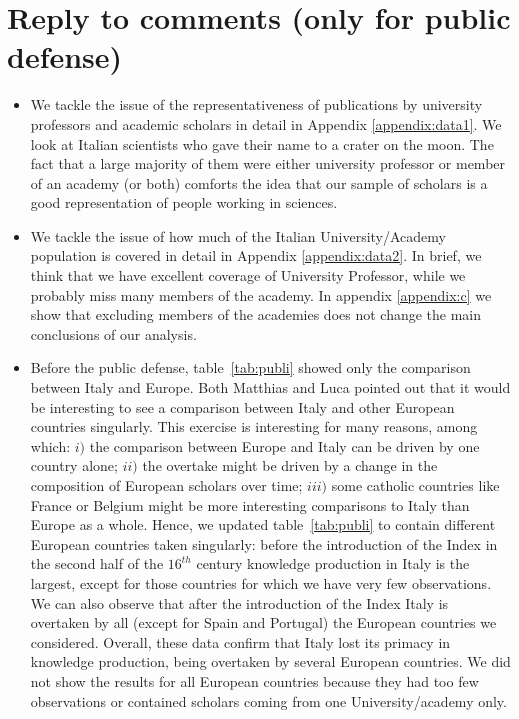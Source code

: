 \section{Reply to comments (only for public defense)}
\begin{itemize}

\item We tackle the issue of the representativeness of publications by university professors and academic scholars in detail in Appendix \ref{appendix:data1}. We look at Italian scientists who gave their name to a crater on the moon. The fact that a large majority of them were either university professor or member of an academy (or both) comforts the idea that our sample of scholars is a good representation of people working in sciences.
\item We tackle the issue of how much of the Italian University/Academy population is covered in detail in Appendix \ref{appendix:data2}. In brief, we think that we have excellent coverage of University Professor, while we probably miss many members of the academy. In appendix \ref{appendix:c} we show that excluding members of the academies does not change the main conclusions of our analysis.
\item Before the public defense, table~\ref{tab:publi} showed only the comparison between Italy and Europe. Both Matthias and Luca pointed out that it would be interesting to see a comparison between Italy and other European countries singularly. This exercise is interesting for many reasons, among which: $i)$ the comparison between Europe and Italy can be driven by one country alone; $ii)$ the overtake might be driven by a change in the composition of European scholars over time; $iii)$ some catholic countries like France or Belgium might be more interesting comparisons to Italy than Europe as a whole. Hence, we updated table~\ref{tab:publi} to contain different European countries taken singularly: before the introduction of the Index in the second half of the $16^{th}$ century knowledge production in Italy is the largest, except for those countries for which we have very few observations. We can also observe that after the introduction of the Index Italy is overtaken by all (except for Spain and Portugal) the European countries we considered. Overall, these data confirm that Italy lost its primacy in knowledge production, being overtaken by several European countries. We did not show the results for all European countries because they had too few observations or contained scholars coming from one University/academy only.


\end{itemize}
